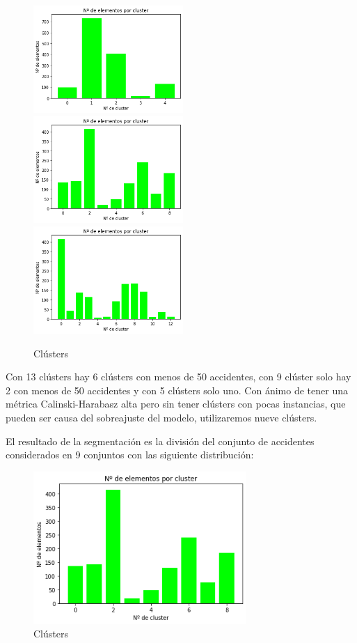 \documentclass[a4]{article}
\begin{document}
\begin{figure}[H]
  \centering
  \caption{Clústers}
  \includegraphics[width=57mm]{imagenes/c2_kmeans_clusters_5}
  \includegraphics[width=57mm]{imagenes/c2_kmeans_clusters}
  \includegraphics[width=57mm]{imagenes/c2_kmeans_clusters_13}
\end{figure}

Con 13 clústers hay 6 clústers con menos de 50 accidentes, con 9 clúster solo hay 2 con menos de 50 accidentes y con 5 clústers solo uno. Con ánimo de tener una métrica Calinski-Harabasz alta pero sin tener clústers con pocas instancias, que pueden ser causa del sobreajuste del modelo, utilizaremos nueve clústers.

El resultado de la segmentación es la división del conjunto de accidentes considerados en 9 conjuntos con las siguiente distribución:

\begin{figure}[H]
  \centering
  \caption{Clústers}
  \includegraphics[width=81mm]{imagenes/c2_kmeans_clusters}
\end{figure}
\end{document}
